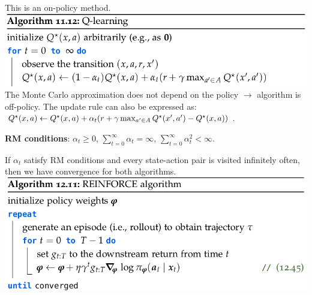 This is an on-policy method.
\includegraphics[width=0.95\linewidth, trim={0 0 3cm 0}]{images/Q_learning.png}
The Monte Carlo approximation does not depend on the policy $\rightarrow$ algorithm is off-policy. The update rule can also be expressed as: $\Q*{x}{a} \gets \Q*{x}{a} + \alpha_t\parentheses*{r + \gamma \max_{a' \in \sA} \Q*{x'}{a'} - \Q*{x}{a}}$.
\begin{framed}
    \textbf{RM conditions}: $\alpha_t \geq 0$, $\sum_{t=0}^{\infty}{\alpha_t} = \infty$, $\sum_{t=0}^{\infty}{\alpha_t^2} < \infty$.
\end{framed}
If $\alpha_t$ satisfy RM conditions and every state-action pair is visited infinitely often, then we have convergence for both algorithms.
\includegraphics[width=\linewidth]{images/REINFORCE.png}
